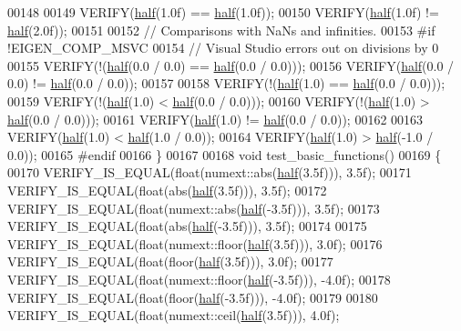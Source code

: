 \begin{DoxyCode}
00148 
00149   VERIFY(\hyperlink{struct_eigen_1_1half}{half}(1.0f) == \hyperlink{struct_eigen_1_1half}{half}(1.0f));
00150   VERIFY(\hyperlink{struct_eigen_1_1half}{half}(1.0f) != \hyperlink{struct_eigen_1_1half}{half}(2.0f));
00151 
00152   \textcolor{comment}{// Comparisons with NaNs and infinities.}
00153 \textcolor{preprocessor}{#if !EIGEN\_COMP\_MSVC}
00154   \textcolor{comment}{// Visual Studio errors out on divisions by 0}
00155   VERIFY(!(\hyperlink{struct_eigen_1_1half}{half}(0.0 / 0.0) == \hyperlink{struct_eigen_1_1half}{half}(0.0 / 0.0)));
00156   VERIFY(\hyperlink{struct_eigen_1_1half}{half}(0.0 / 0.0) != \hyperlink{struct_eigen_1_1half}{half}(0.0 / 0.0));
00157 
00158   VERIFY(!(\hyperlink{struct_eigen_1_1half}{half}(1.0) == \hyperlink{struct_eigen_1_1half}{half}(0.0 / 0.0)));
00159   VERIFY(!(\hyperlink{struct_eigen_1_1half}{half}(1.0) < \hyperlink{struct_eigen_1_1half}{half}(0.0 / 0.0)));
00160   VERIFY(!(\hyperlink{struct_eigen_1_1half}{half}(1.0) > \hyperlink{struct_eigen_1_1half}{half}(0.0 / 0.0)));
00161   VERIFY(\hyperlink{struct_eigen_1_1half}{half}(1.0) != \hyperlink{struct_eigen_1_1half}{half}(0.0 / 0.0));
00162 
00163   VERIFY(\hyperlink{struct_eigen_1_1half}{half}(1.0) < \hyperlink{struct_eigen_1_1half}{half}(1.0 / 0.0));
00164   VERIFY(\hyperlink{struct_eigen_1_1half}{half}(1.0) > \hyperlink{struct_eigen_1_1half}{half}(-1.0 / 0.0));
00165 \textcolor{preprocessor}{#endif}
00166 \}
00167 
00168 \textcolor{keywordtype}{void} test\_basic\_functions()
00169 \{
00170   VERIFY\_IS\_EQUAL(\textcolor{keywordtype}{float}(numext::abs(\hyperlink{struct_eigen_1_1half}{half}(3.5f))), 3.5f);
00171   VERIFY\_IS\_EQUAL(\textcolor{keywordtype}{float}(abs(\hyperlink{struct_eigen_1_1half}{half}(3.5f))), 3.5f);
00172   VERIFY\_IS\_EQUAL(\textcolor{keywordtype}{float}(numext::abs(\hyperlink{struct_eigen_1_1half}{half}(-3.5f))), 3.5f);
00173   VERIFY\_IS\_EQUAL(\textcolor{keywordtype}{float}(abs(\hyperlink{struct_eigen_1_1half}{half}(-3.5f))), 3.5f);
00174 
00175   VERIFY\_IS\_EQUAL(\textcolor{keywordtype}{float}(numext::floor(\hyperlink{struct_eigen_1_1half}{half}(3.5f))), 3.0f);
00176   VERIFY\_IS\_EQUAL(\textcolor{keywordtype}{float}(floor(\hyperlink{struct_eigen_1_1half}{half}(3.5f))), 3.0f);
00177   VERIFY\_IS\_EQUAL(\textcolor{keywordtype}{float}(numext::floor(\hyperlink{struct_eigen_1_1half}{half}(-3.5f))), -4.0f);
00178   VERIFY\_IS\_EQUAL(\textcolor{keywordtype}{float}(floor(\hyperlink{struct_eigen_1_1half}{half}(-3.5f))), -4.0f);
00179 
00180   VERIFY\_IS\_EQUAL(\textcolor{keywordtype}{float}(numext::ceil(\hyperlink{struct_eigen_1_1half}{half}(3.5f))), 4.0f);

\end{DoxyCode}
